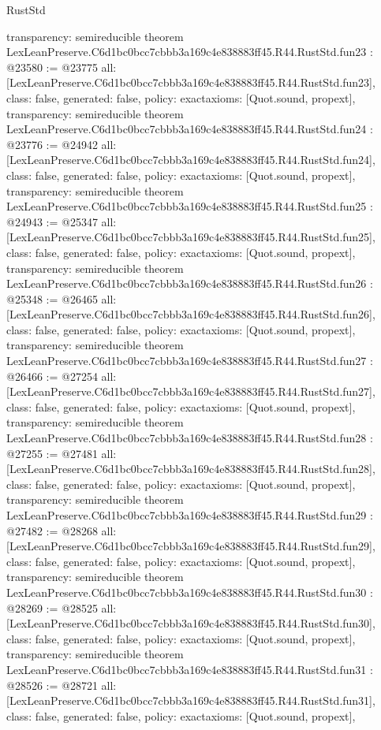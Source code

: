 \begin{lexlean}{RustStd}
\begin{coremodule}
{  transparency: semireducible
}
theorem LexLeanPreserve.C6d1bc0bcc7cbbb3a169c4e838883ff45.R44.RustStd.fun23 : @23580 := @23775 {
  all: [LexLeanPreserve.C6d1bc0bcc7cbbb3a169c4e838883ff45.R44.RustStd.fun23],
  class: false,
  generated: false,
  policy: exact{axioms: [Quot.sound, propext]},
  transparency: semireducible
}
theorem LexLeanPreserve.C6d1bc0bcc7cbbb3a169c4e838883ff45.R44.RustStd.fun24 : @23776 := @24942 {
  all: [LexLeanPreserve.C6d1bc0bcc7cbbb3a169c4e838883ff45.R44.RustStd.fun24],
  class: false,
  generated: false,
  policy: exact{axioms: [Quot.sound, propext]},
  transparency: semireducible
}
theorem LexLeanPreserve.C6d1bc0bcc7cbbb3a169c4e838883ff45.R44.RustStd.fun25 : @24943 := @25347 {
  all: [LexLeanPreserve.C6d1bc0bcc7cbbb3a169c4e838883ff45.R44.RustStd.fun25],
  class: false,
  generated: false,
  policy: exact{axioms: [Quot.sound, propext]},
  transparency: semireducible
}
theorem LexLeanPreserve.C6d1bc0bcc7cbbb3a169c4e838883ff45.R44.RustStd.fun26 : @25348 := @26465 {
  all: [LexLeanPreserve.C6d1bc0bcc7cbbb3a169c4e838883ff45.R44.RustStd.fun26],
  class: false,
  generated: false,
  policy: exact{axioms: [Quot.sound, propext]},
  transparency: semireducible
}
theorem LexLeanPreserve.C6d1bc0bcc7cbbb3a169c4e838883ff45.R44.RustStd.fun27 : @26466 := @27254 {
  all: [LexLeanPreserve.C6d1bc0bcc7cbbb3a169c4e838883ff45.R44.RustStd.fun27],
  class: false,
  generated: false,
  policy: exact{axioms: [Quot.sound, propext]},
  transparency: semireducible
}
theorem LexLeanPreserve.C6d1bc0bcc7cbbb3a169c4e838883ff45.R44.RustStd.fun28 : @27255 := @27481 {
  all: [LexLeanPreserve.C6d1bc0bcc7cbbb3a169c4e838883ff45.R44.RustStd.fun28],
  class: false,
  generated: false,
  policy: exact{axioms: [Quot.sound, propext]},
  transparency: semireducible
}
theorem LexLeanPreserve.C6d1bc0bcc7cbbb3a169c4e838883ff45.R44.RustStd.fun29 : @27482 := @28268 {
  all: [LexLeanPreserve.C6d1bc0bcc7cbbb3a169c4e838883ff45.R44.RustStd.fun29],
  class: false,
  generated: false,
  policy: exact{axioms: [Quot.sound, propext]},
  transparency: semireducible
}
theorem LexLeanPreserve.C6d1bc0bcc7cbbb3a169c4e838883ff45.R44.RustStd.fun30 : @28269 := @28525 {
  all: [LexLeanPreserve.C6d1bc0bcc7cbbb3a169c4e838883ff45.R44.RustStd.fun30],
  class: false,
  generated: false,
  policy: exact{axioms: [Quot.sound, propext]},
  transparency: semireducible
}
theorem LexLeanPreserve.C6d1bc0bcc7cbbb3a169c4e838883ff45.R44.RustStd.fun31 : @28526 := @28721 {
  all: [LexLeanPreserve.C6d1bc0bcc7cbbb3a169c4e838883ff45.R44.RustStd.fun31],
  class: false,
  generated: false,
  policy: exact{axioms: [Quot.sound, propext]},
}
\end{coremodule}
\end{lexlean}

